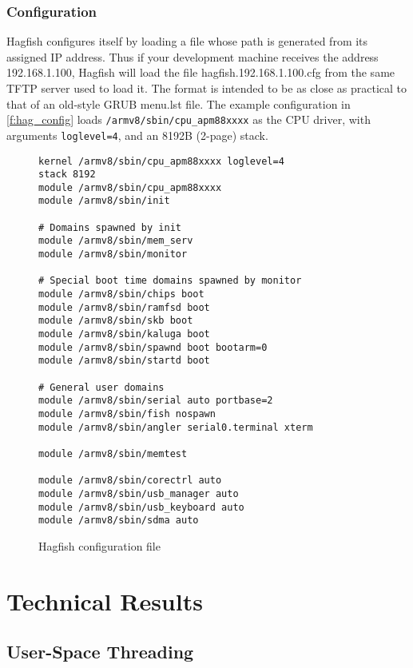 \documentclass[a4paper,twoside]{report}
\begin{document}
\subsection{Configuration}

Hagfish configures itself by loading a file whose path is generated from its
assigned IP address. Thus if your development machine receives the address
192.168.1.100, Hagfish will load the file hagfish.192.168.1.100.cfg from the
same TFTP server used to load it. The format is intended to be as close as
practical to that of an old-style GRUB menu.lst file. The example
configuration in \autoref{f:hag_config} loads
\texttt{/armv8/sbin/cpu\_apm88xxxx} as the CPU driver, with arguments
\texttt{loglevel=4}, and an 8192B (2-page) stack.

\begin{figure}
\begin{center}
\begin{lstlisting}
kernel /armv8/sbin/cpu_apm88xxxx loglevel=4
stack 8192
module /armv8/sbin/cpu_apm88xxxx
module /armv8/sbin/init

# Domains spawned by init
module /armv8/sbin/mem_serv
module /armv8/sbin/monitor

# Special boot time domains spawned by monitor
module /armv8/sbin/chips boot
module /armv8/sbin/ramfsd boot
module /armv8/sbin/skb boot
module /armv8/sbin/kaluga boot
module /armv8/sbin/spawnd boot bootarm=0
module /armv8/sbin/startd boot

# General user domains
module /armv8/sbin/serial auto portbase=2
module /armv8/sbin/fish nospawn
module /armv8/sbin/angler serial0.terminal xterm

module /armv8/sbin/memtest

module /armv8/sbin/corectrl auto
module /armv8/sbin/usb_manager auto
module /armv8/sbin/usb_keyboard auto
module /armv8/sbin/sdma auto
\end{lstlisting}
\end{center}
\caption{Hagfish configuration file}
\label{f:hag_config}
\end{figure}

\chapter{Technical Results}

\section{User-Space Threading}\label{s:threads}
\end{document}

